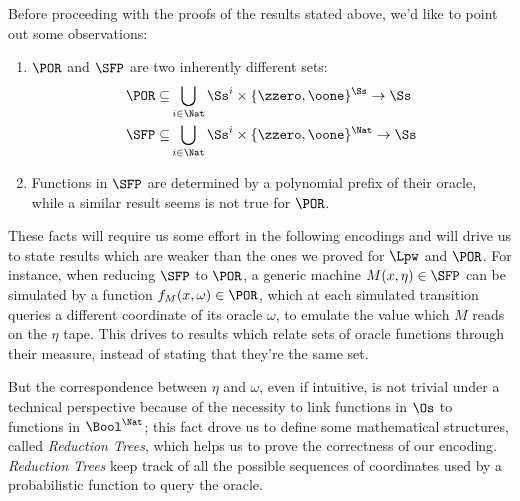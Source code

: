\begin{conditional}{\notappendix}
\begin{comment}
    \begin{lemma}
    For every deterministic $\SFP$-machine,
    $M := \langle \Qs, \Sigma, \delta,q_0\rangle$,
    there exists a $\POR$-function $f$, such that:
    $$
    f(\sigma,\eta)= M.
    $$
    \end{lemma}
\end{comment}

  Before proceeding with the proofs of the results stated above, we'd like to
  point out some observations:

  \begin{enumerate}
    \item $\POR$ and $\SFP$ are two inherently different sets:
    \begin{align*}
      \POR \subseteq & \bigcup_{i \in \Nat} \Ss^i\times \{\zzero, \oone\}^\Ss \to \Ss\\
      \SFP \subseteq & \bigcup_{i \in \Nat} \Ss^i\times \{\zzero, \oone\}^\Nat \to \Ss
    \end{align*}
    \item Functions in $\SFP$ are determined by a polynomial prefix of their oracle,
    while a similar result seems is not true for $\POR$.
  \end{enumerate}

  These facts will require us some effort in the following encodings and will drive us
  to state results which are weaker than the ones we proved for $\Lpw$ and $\POR$.
  For instance, when reducing $\SFP$ to $\POR$,
  a generic machine $M(x, \eta) \in \SFP$ can
  be simulated by a function $f_M(x, \omega) \in \POR$, which at each
  simulated transition queries a different coordinate of its oracle $\omega$,
  to emulate the value which $M$ reads on the $\eta$ tape.
  This drives to results which relate sets of oracle functions through their
  measure, instead of stating that they're the same set.

  But the correspondence between $\eta$ and $\omega$, even if intuitive, is not
  trivial under a technical perspective because of the necessity
  to link functions in $\Os$ to functions in $\Bool^\Nat$; this fact
  drove us to define some mathematical structures, called \emph{Reduction Trees},
  which helps us to prove the correctness of our encoding. \emph{Reduction Trees}
  keep track of all the possible sequences of coordinates used by a probabilistic
  function to query the oracle.



\end{conditional}
